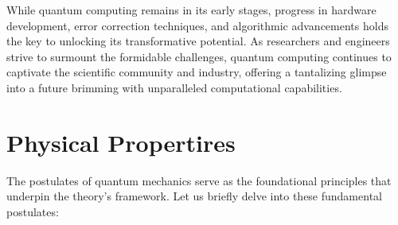 \documentclass[
  journal=largetwo,
  year=2023,
]{cup-journal}
\begin{document}
While quantum computing remains in its early stages, progress in hardware development, error correction techniques, and algorithmic advancements holds the key to unlocking its transformative potential. As researchers and engineers strive to surmount the formidable challenges, quantum computing continues to captivate the scientific community and industry, offering a tantalizing glimpse into a future brimming with unparalleled computational capabilities.


\section{Physical Propertires}
\label{sec:physical_properties}

The postulates of quantum mechanics serve as the foundational principles that underpin the theory's framework. Let us briefly delve into these fundamental postulates\autocite{cohentannoudji_1977_quantum}:
\end{document}
